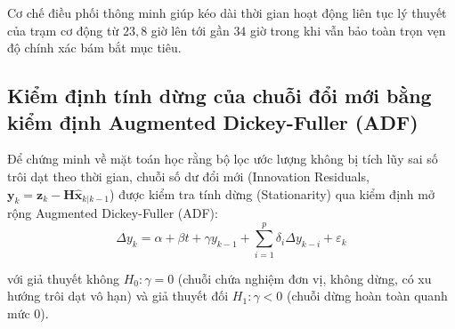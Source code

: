 \begin{table}[H]
\centering
\caption{Ước lượng lý thuyết mức tiết kiệm năng lượng và thời lượng pin khi kích hoạt chế độ Adaptive Scaling}
\label{tab:adaptive-energy-scaling-results}
\end{table}

Cơ chế điều phối thông minh giúp kéo dài thời gian hoạt động liên tục lý thuyết của trạm cơ động từ $23{,}8$ giờ lên tới gần $34$ giờ trong khi vẫn bảo toàn trọn vẹn độ chính xác bám bắt mục tiêu.

\subsection{Kiểm định tính dừng của chuỗi đổi mới bằng kiểm định Augmented Dickey-Fuller (ADF)}

\hspace{0.5cm} Để chứng minh về mặt toán học rằng bộ lọc ước lượng không bị tích lũy sai số trôi dạt theo thời gian, chuỗi số dư đổi mới (Innovation Residuals, $\mathbf{y}_k = \mathbf{z}_k - \mathbf{H}\hat{\mathbf{x}}_{k|k-1}$) được kiểm tra tính dừng (Stationarity) qua kiểm định mở rộng Augmented Dickey-Fuller (ADF):
\begin{equation}
\Delta y_k = \alpha + \beta t + \gamma y_{k-1} + \sum_{i=1}^p \delta_i \Delta y_{k-i} + \varepsilon_k
\label{eq:adf-test-regression-formula}
\end{equation}

với giả thuyết không $H_0: \gamma = 0$ (chuỗi chứa nghiệm đơn vị, không dừng, có xu hướng trôi dạt vô hạn) và giả thuyết đối $H_1: \gamma < 0$ (chuỗi dừng hoàn toàn quanh mức 0).

